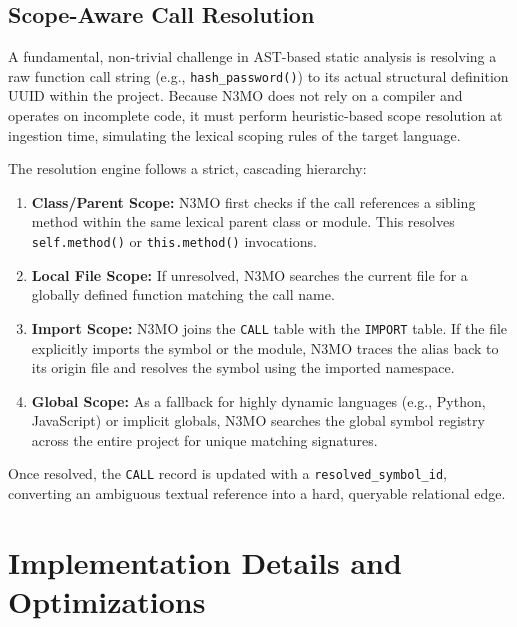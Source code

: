 \documentclass[conference]{IEEEtran}
\begin{document}
\subsection{Scope-Aware Call Resolution}
A fundamental, non-trivial challenge in AST-based static analysis is resolving a raw function call string (e.g., \texttt{hash\_password()}) to its actual structural definition UUID within the project. Because N3MO does not rely on a compiler and operates on incomplete code, it must perform heuristic-based scope resolution at ingestion time, simulating the lexical scoping rules of the target language.

The resolution engine follows a strict, cascading hierarchy:
\begin{enumerate}
    \item \textbf{Class/Parent Scope:} N3MO first checks if the call references a sibling method within the same lexical parent class or module. This resolves \texttt{self.method()} or \texttt{this.method()} invocations.
    \item \textbf{Local File Scope:} If unresolved, N3MO searches the current file for a globally defined function matching the call name.
    \item \textbf{Import Scope:} N3MO joins the \texttt{CALL} table with the \texttt{IMPORT} table. If the file explicitly imports the symbol or the module, N3MO traces the alias back to its origin file and resolves the symbol using the imported namespace.
    \item \textbf{Global Scope:} As a fallback for highly dynamic languages (e.g., Python, JavaScript) or implicit globals, N3MO searches the global symbol registry across the entire project for unique matching signatures.
\end{enumerate}

Once resolved, the \texttt{CALL} record is updated with a \texttt{resolved\_symbol\_id}, converting an ambiguous textual reference into a hard, queryable relational edge.

\section{Implementation Details and Optimizations}
\end{document}
